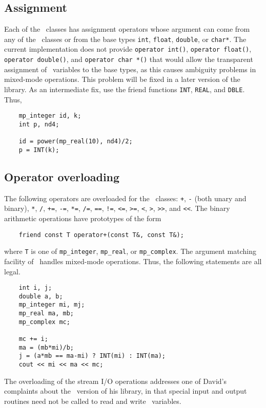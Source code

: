 \subsection{Assignment}

Each of the \mp\ classes has assignment operators whose argument
can come from any of the \mp\ classes or from the base types
\verb|int|, \verb|float|, \verb|double|, or \verb|char*|.
The current implementation does not provide \verb|operator int()|,
\verb|operator float()|,
\verb|operator double()|,
and \verb|operator char *()|
that would allow the transparent assignment of \mp\ variables to
the base types,
as this causes ambiguity problems in mixed-mode operations.
This problem will be fixed in a later version of the library.
As an intermediate fix,
use the friend functions \verb|INT|, \verb|REAL|, and \verb|DBLE|.
Thus,
\begin{verbatim}
    mp_integer id, k;
    int p, nd4;

    id = power(mp_real(10), nd4)/2;
    p = INT(k);
\end{verbatim}

\subsection{Operator overloading}

The following operators are overloaded for the \mp\ classes:
\verb|+|,
\verb|-| (both unary and binary),
\verb|*|,
\verb|/|,
\verb|+=|,
\verb|-=|,
\verb|*=|,
\verb|/=|,
\verb|==|,
\verb|!=|,
\verb|<=|,
\verb|>=|,
\verb|<|,
\verb|>|,
\verb|>>|,
and \verb|<<|.
The binary arithmetic operations have prototypes of the form
\begin{verbatim}
    friend const T operator+(const T&, const T&);
\end{verbatim}
where \verb|T| is one of \verb|mp_integer|, \verb|mp_real|, or
\verb|mp_complex|.
The argument matching facility of \CC\ handles mixed-mode operations.
Thus,
the following statements are all legal.
\begin{verbatim}
    int i, j;
    double a, b;
    mp_integer mi, mj;
    mp_real ma, mb;
    mp_complex mc;

    mc += i;
    ma = (mb*mi)/b;
    j = (a*mb == ma-mi) ? INT(mi) : INT(ma);
    cout << mi << ma << mc;
\end{verbatim}

The overloading of the stream I/O operations addresses one of David's
complaints about the \Fninety\ version of his library,
in that special input and output routines need not be called to read
and write \mp\ variables.

